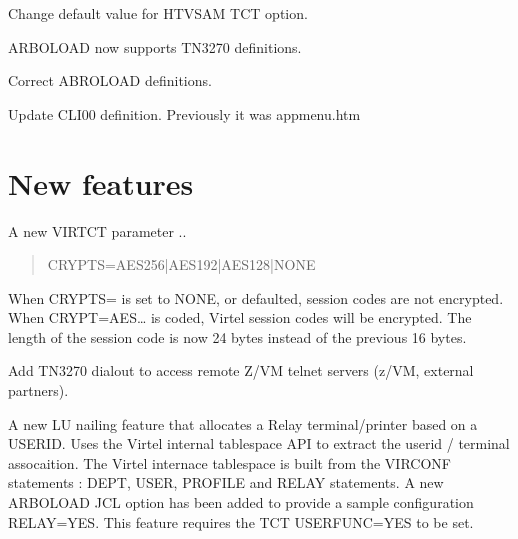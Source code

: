 \documentclass[letterpaper,10pt,english]{sphinxmanual}
\begin{document}
\sphinxAtStartPar
{}

\sphinxAtStartPar
Change default value for HTVSAM TCT option.

\sphinxAtStartPar
{}

\sphinxAtStartPar
ARBOLOAD now supports TN3270 definitions.

\sphinxAtStartPar
{}

\sphinxAtStartPar
Correct ABROLOAD definitions.

\sphinxAtStartPar
{}

\sphinxAtStartPar
Update CLI\sphinxhyphen{}00 definition. Previously it was appmenu.htm

\newpage


\chapter{New features}
\label{\detokenize{TN202403:new-features}}
\sphinxAtStartPar
{}

\sphinxAtStartPar
A new VIRTCT parameter
..
\begin{quote}

\sphinxAtStartPar
CRYPTS=AES\sphinxhyphen{}256|AES\sphinxhyphen{}192|AES\sphinxhyphen{}128|NONE
\end{quote}

\sphinxAtStartPar
When CRYPTS= is set to NONE, or defaulted, session codes are not encrypted. When CRYPT=AES\sphinxhyphen{}… is coded, Virtel session codes will be encrypted. The length of the session code is now 24 bytes instead of the previous 16 bytes.

\sphinxAtStartPar
{}

\sphinxAtStartPar
Add TN3270 dialout to access remote Z/VM telnet servers (z/VM, external partners).

\sphinxAtStartPar
{}

\sphinxAtStartPar
A new LU nailing feature that allocates a Relay terminal/printer based on a USERID. Uses the Virtel internal tablespace API to extract the userid / terminal assocaition. The Virtel internace tablespace is built from the VIRCONF statements :\sphinxhyphen{} DEPT, USER, PROFILE and RELAY statements. A new ARBOLOAD JCL option has been added to provide a sample configuration \sphinxhyphen{} RELAY=YES. This feature requires the TCT USERFUNC=YES to be set.
\end{document}
